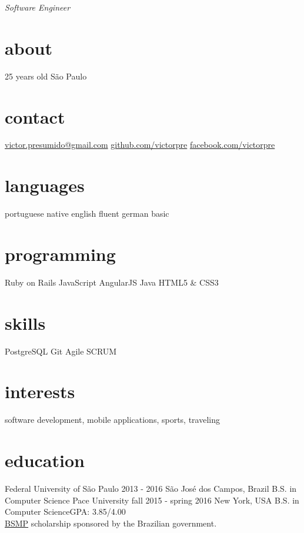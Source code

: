 \documentclass[]{friggeri-cv}
\begin{document}
       {\textit{Software Engineer}}


\begin{aside}
  \section{about}
	25 years old
	São Paulo
  \section{contact}
    {\footnotesize \href{mailto:victor.presumido@gmail.com}{victor.presumido@gmail.com}}
    \href{https://github.com/victorpre/}{github.com/victorpre}
    \href{http://facebook.com/victorpre}{facebook.com/victorpre}
  \section{languages}
    portuguese native
    english fluent
    german basic
  \section{programming}
    Ruby on Rails
    JavaScript
    AngularJS
    Java
	HTML5 \& CSS3
 \section{skills}
	PostgreSQL
	Git
	Agile SCRUM
\end{aside}


\section{interests}

software development, mobile applications, sports, traveling

\section{education}

\begin{entrylist}
  \entry
    {Federal University of São Paulo}
    {2013 - 2016}
    {São José dos Campos, Brazil}
    {B.S. in Computer Science}
  \entry
    {Pace University}
    {fall 2015 - spring 2016}
    {New York, USA}
    {B.S. in Computer Science\hfill{\small GPA: 3.85/4.00}\\
    \href{http://www.iie.org/programs/brazil-scientific-mobility}{BSMP} scholarship sponsored by the Brazilian government.}
 \end{entrylist}
\end{document}
